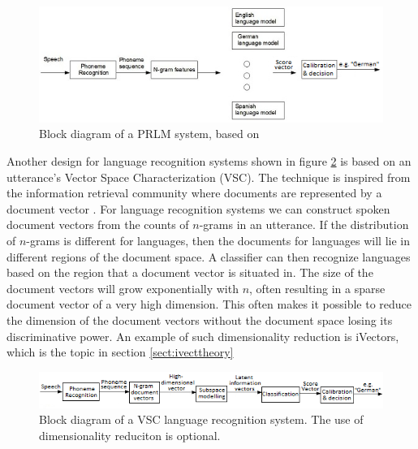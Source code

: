\begin{figure}[hbt!]
	\begin{center}
	\includegraphics[width=\textwidth]{figures/prlm.png}
	\caption{Block diagram of a PRLM system, based on \cite[Fig. 41.5]{lidbok}}
	\label{fig:prlmoverview}
	\end{center}
\end{figure}

Another design for language recognition systems shown in figure \ref{fig:vscoverview} is based on an utterance's Vector Space Characterization (VSC). The technique is inspired from the information retrieval community where documents are represented by a document vector \cite[p. 826]{lidbok}. For language recognition systems we can construct spoken document vectors from the counts of $n$-grams in an utterance. If the distribution of $n$-grams is different for languages, then the documents for languages will lie in different regions of the document space. A classifier can then recognize languages based on the region that a document vector is situated in. The size of the document vectors will grow exponentially with $n$, often resulting in a sparse document vector of a very high dimension. This often makes it possible to reduce the dimension of the document vectors without the document space losing its discriminative power. An example of such dimensionality reduction is iVectors, which is the topic in section \ref{sect:ivecttheory}

\begin{figure}[hbt!]
	\begin{center}
	\includegraphics[width=\textwidth]{figures/vsc.png}
	\caption{Block diagram of a VSC language recognition system. The use of dimensionality reduciton is optional.}
	\label{fig:vscoverview}
	\end{center}
\end{figure}

